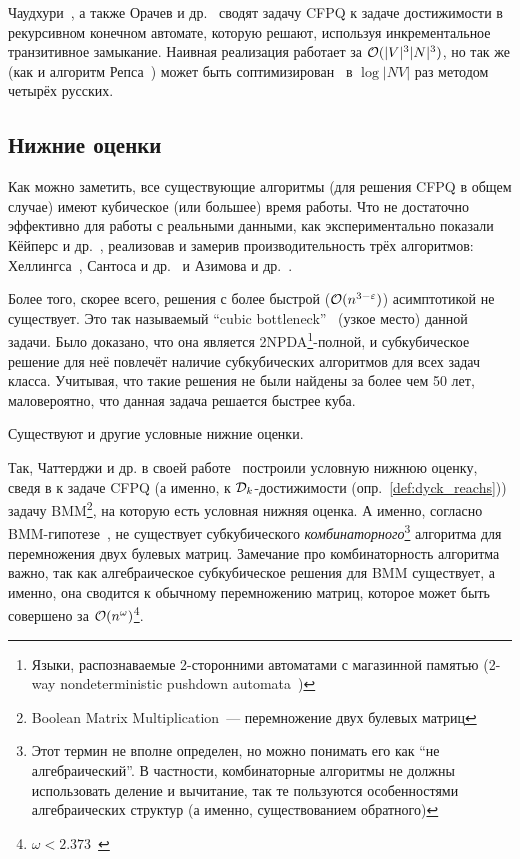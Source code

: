 Чаудхури~\cite{Chaudhuri08}, а также Орачев и др.~\cite{Orachev20} сводят задачу CFPQ к задаче достижимости в рекурсивном конечном автомате, которую решают, используя инкрементальное транзитивное замыкание. Наивная реализация работает за $\mathcal{O}(|V|^3 |N|^3)$, но так же (как и алгоритм Репса~\cite{Reps97,Chaudhuri06}) может быть соптимизирован~\cite{Shemetova21} в $\log |NV|$ раз методом четырёх русских.

\subsection{Нижние оценки}

Как можно заметить, все существующие алгоритмы (для решения CFPQ в общем случае) имеют кубическое (или большее) время работы. Что не достаточно эффективно для работы с реальными данными, как экспериментально показали Кёйперс и др.~\cite{Kuijpers19}, реализовав и замерив производительность трёх алгоритмов: Хеллингса~\cite{Hellings15}, Сантоса и др.~\cite{Santos18} и Азимова и др.~\cite{Santos18}.

Более того, скорее всего, решения с более быстрой ($\mathcal{O}(n^{3 - \varepsilon})$) асимптотикой не существует. Это так называемый ``cubic bottleneck''~\cite{Heintze1997} (узкое место) данной задачи. Было доказано, что она является 2NPDA\footnote{Языки, распознаваемые 2-сторонними автоматами с магазинной памятью (2-way nondeterministic pushdown automata~\cite{Aho1968})}-полной, и субкубическое решение для неё повлечёт наличие субкубических алгоритмов для всех задач класса. Учитывая, что такие решения не были найдены за более чем 50 лет, маловероятно, что данная задача решается быстрее куба. 

Существуют и другие условные нижние оценки. 

Так, Чаттерджи и др. в своей работе~\cite{Chatterjee17} построили условную нижнюю оценку, сведя в к задаче CFPQ (а именно, к $\mathcal{D}_k$-достижимости (опр.~\ref{def:dyck_reachs})) задачу BMM\footnote{Boolean Matrix Multiplication~--- перемножение двух булевых матриц}, на которую есть условная нижняя оценка. А именно, согласно BMM-гипотезе~\cite{Williams18}, не существует субкубического \textit{комбинаторного}\footnote{Этот термин не вполне определен, но можно понимать его как ``не алгебраический''. В частности, комбинаторные алгоритмы не должны использовать деление и вычитание, так те пользуются особенностями алгебраических структур (а именно, существованием обратного)} алгоритма для перемножения двух булевых матриц. Замечание про комбинаторность алгоритма важно, так как алгебраическое субкубическое решения для BMM существует, а именно, она сводится к обычному перемножению матриц, которое может быть совершено за $\mathcal{O}(n^{\omega})$\footnote{$\omega < 2.373$~\cite{Alman20}}.

